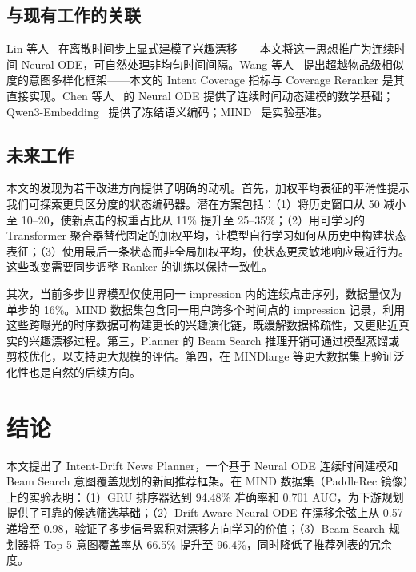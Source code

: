\documentclass[twocolumn,10pt,a4paper]{ctexart}
\begin{document}
\subsection{与现有工作的关联}

Lin 等人~\cite{lin2025interest} 在离散时间步上显式建模了兴趣漂移——本文将这一思想推广为连续时间 Neural ODE，可自然处理非均匀时间间隔。Wang 等人~\cite{wang2025intent} 提出超越物品级相似度的意图多样化框架——本文的 Intent Coverage 指标与 Coverage Reranker 是其直接实现。Chen 等人~\cite{chen2018neural} 的 Neural ODE 提供了连续时间动态建模的数学基础；Qwen3-Embedding~\cite{qwen3embedding} 提供了冻结语义编码；MIND~\cite{wu2020mind} 是实验基准。

\subsection{未来工作}

本文的发现为若干改进方向提供了明确的动机。首先，加权平均表征的平滑性提示我们可探索更具区分度的状态编码器。潜在方案包括：（1）将历史窗口从 50 减小至 10--20，使新点击的权重占比从 11\% 提升至 25--35\%；（2）用可学习的 Transformer 聚合器替代固定的加权平均，让模型自行学习如何从历史中构建状态表征；（3）使用最后一条状态而非全局加权平均，使状态更灵敏地响应最近行为。这些改变需要同步调整 Ranker 的训练以保持一致性。

其次，当前多步世界模型仅使用同一 impression 内的连续点击序列，数据量仅为单步的 16\%。MIND 数据集包含同一用户跨多个时间点的 impression 记录，利用这些跨曝光的时序数据可构建更长的兴趣演化链，既缓解数据稀疏性，又更贴近真实的兴趣漂移过程。第三，Planner 的 Beam Search 推理开销可通过模型蒸馏或剪枝优化，以支持更大规模的评估。第四，在 MINDlarge 等更大数据集上验证泛化性也是自然的后续方向。

\section{结论}

本文提出了 Intent-Drift News Planner，一个基于 Neural ODE 连续时间建模和 Beam Search 意图覆盖规划的新闻推荐框架。在 MIND 数据集（PaddleRec 镜像）上的实验表明：（1）GRU 排序器达到 94.48\% 准确率和 0.701 AUC，为下游规划提供了可靠的候选筛选基础；（2）Drift-Aware Neural ODE 在漂移余弦上从 0.57 递增至 0.98，验证了多步信号累积对漂移方向学习的价值；（3）Beam Search 规划器将 Top-5 意图覆盖率从 66.5\% 提升至 96.4\%，同时降低了推荐列表的冗余度。
\end{document}
